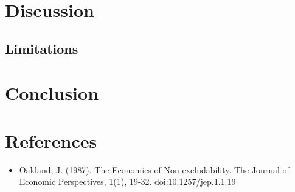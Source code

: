 \documentclass[
  10pt,
  paper=a4,
  ,captions=tableheading
]{scrartcl}
\providecommand{\tightlist}{%
  \setlength{\itemsep}{0pt}\setlength{\parskip}{0pt}}
\begin{document}
\hypertarget{discussion}{%
\section{Discussion}\label{discussion}}

\hypertarget{limitations}{%
\subsection{Limitations}\label{limitations}}

\hypertarget{conclusion-1}{%
\section{Conclusion}\label{conclusion-1}}

\hypertarget{references}{%
\section{References}\label{references}}

\begin{itemize}
\tightlist
\item
  Oakland, J. (1987). The Economics of Non-excludability. The Journal of
  Economic Perspectives, 1(1), 19-32. doi:10.1257/jep.1.1.19
\end{itemize}
\end{document}
